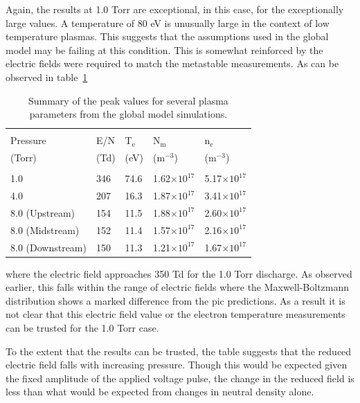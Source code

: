 Again, the results at 1.0 Torr are exceptional, in this case, for the
exceptionally large values. A temperature of 80 eV is unusually large in the
context of low temperature plasmas. This suggests that the assumptions used in
the global model may be failing at this condition. This is somewhat reinforced
by the electric fields were required to match the metastable measurements. As
can be observed in table~\ref{tbl:simsum}
\begin{table}
  \centering
  \caption{Summary of the peak values for several plasma parameters from the
  global model simulations.}
  \begin{tabular}{lllll}
    \toprule \\
    Pressure         & E/N  & T$_\mathrm{e}$ & N$_\mathrm{m}$ & n$_\mathrm{e}$ \\
    (Torr)           & (Td) & (eV)           &  (m$^{-3}$)    & (m$^{-3}$) \\
    \midrule \\
    1.0              & 346  & 74.6           & 1.62$\times10^{17}$ & 
      5.17$\times10^{17}$ \\
    4.0              & 207  & 16.3           & 1.87$\times10^{17}$ &
      3.41$\times10^{17}$ \\
    8.0 (Upstream)   & 154  & 11.5           & 1.88$\times10^{17}$ &
      2.60$\times10^{17}$ \\
    8.0 (Midstream)  & 152  & 11.4           & 1.57$\times10^{17}$ & 
      2.16$\times10^{17}$ \\
    8.0 (Downstream) & 150  & 11.3           & 1.21$\times10^{17}$ &
      1.67$\times10^{17}$ \\
    \bottomrule
  \end{tabular}
  \label{tbl:simsum}
\end{table}
where the electric field approaches 350 Td for the 1.0 Torr discharge. As
observed earlier, this falls within the range of electric fields where the
Maxwell-Boltzmann distribution shows a marked difference from the \acs{pic}
predictions. As a result it is not clear that this electric field value or the
electron temperature measurements can be trusted for the 1.0 Torr case. 

To the extent that the results can be trusted, the table suggests that the
reduced electric field falls with increasing pressure. Though this would be
expected given the fixed amplitude of the applied voltage pulse, the change in
the reduced field is less than what would be expected from changes in neutral
density alone. 


